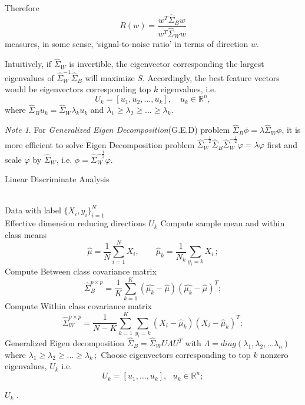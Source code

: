 \documentclass[twoside]{article}
\theoremstyle{definition}
\theoremstyle{definition}
\theoremstyle{remark}
\newtheorem*{note}{Note}
\def\R{{\mathbb R}}
\begin{document}
Therefore $$ R(w) = \frac{w^T \hat{\Sigma}_B w}{ w^T \hat{\Sigma}_W w} $$ 
measures, in some sense, `signal-to-noise ratio' in terms of direction $w$. 

Intuitively, if $\hat{\Sigma}_W$ is invertible, the eigenvector corresponding the largest eigenvalues of $\hat{\Sigma}_W^{-1} \hat{\Sigma}_B$ will maximize $S$. Accordingly, the best feature vectors would be eigenvectors corresponding top $k$ eigenvalues, i.e.
$$U_k = [u_1,u_2,...,u_k], \quad u_k \in \mathbb{R}^n, $$
where $\hat{\Sigma}_B u_k = \hat{\Sigma}_W \lambda_k u_k$ and $\lambda_1 \ge \lambda_2 \ge ... 
\ge \lambda_k$.


\begin{note}
 For \emph{Generalized Eigen Decomposition}(G.E.D) problem $\hat{\Sigma}_B \phi =  \lambda \hat{\Sigma}_W \phi $, it is more efficient to solve Eigen Decomposition problem $\hat{\Sigma}_W^{-\frac{1}{2}} \hat{\Sigma}_B \hat{\Sigma}_W^{-\frac{1}{2}} \varphi = \lambda \varphi$ first and scale $\varphi$ by $\hat{\Sigma}_W$, i.e. $\phi = \hat{\Sigma}_W^{-\frac{1}{2}} \varphi $.
 \end{note}

\renewcommand{\algorithmicrequire}{ \textbf{Input:}} %
\renewcommand{\algorithmicensure}{ \textbf{Output:}} %

\begin{algorithm}[htb]   
\caption{Linear Discriminate Analysis}   
\label{alg:lda}   
\begin{algorithmic}[1] %
\REQUIRE ~~\\ %
 Data with label $\{X_i,y_i\}_{i=1}^N $
\ENSURE ~~\\ %
Effective dimension reducing directions $U_k$
\STATE Compute sample mean and within class means $$\hat{\mu} = \frac{1}{N} \sum\limits_{i=1}^N X_i,\quad\quad \hat{\mu}_k = \frac{1}{N_k} \sum\limits_{y_i=k} X_i \,;$$   
\STATE Compute Between class covariance matrix 
 $$\hat{\Sigma}_B^{p\times p} = \frac{1}{K} \sum_{k=1}^K(\hat{\mu_k} - \hat{\mu})(\hat{\mu_k} - \hat{\mu})^T ;$$  
\STATE Compute Within class covariance matrix 
 $$\hat{\Sigma}_W^{p\times p}  = \frac{1}{N-K} \sum\limits_{k=1}^K\sum\limits_{y_i=k}(X_i - \hat{\mu}_k)(X_i - \hat{\mu}_k)^T;$$
\STATE Generalized Eigen decomposition $\hat{\Sigma}_B = \hat{\Sigma}_W U\Lambda U^T $ with $\Lambda = diag(\lambda_1,\lambda_2,...\lambda_n)$ where  $\lambda_1 \ge \lambda_2 \ge ... \ge \lambda_k\,;$
\STATE Choose eigenvectors corresponding to top $k$ nonzero eigenvalues, $U_k$ i.e.
$$U_k=[u_1,\ldots,u_k], \ \ \ u_k\in \R^n ;$$ 

\RETURN $U_k$ . %
\end{algorithmic}  
\end{algorithm}  
\end{document}
